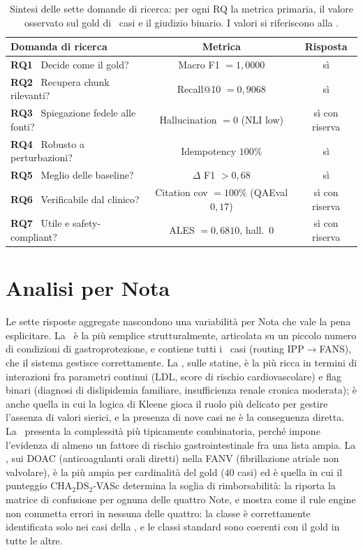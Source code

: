 \begin{table}[t]
  \centering
  \caption{Sintesi delle sette domande di ricerca: per ogni RQ la metrica primaria, il valore osservato sul gold di \goldn\ casi e il giudizio binario. I valori si riferiscono alla \cleanroomrun.}
  \label{tab:rq-summary}
  \small
  \begin{tabular}{p{}cc}
    \toprule
    Domanda di ricerca & Metrica & Risposta \\
    \midrule
    \textbf{RQ1}~ Decide come il gold? & Macro F1 $=1{,}0000$ & sì \\
    \textbf{RQ2}~ Recupera chunk rilevanti? & Recall@10 $=0{,}9068$ & sì \\
    \textbf{RQ3}~ Spiegazione fedele alle fonti? & Hallucination $=0$ (NLI low) & sì con riserva \\
    \textbf{RQ4}~ Robusto a perturbazioni? & Idempotency $100\%$ & sì \\
    \textbf{RQ5}~ Meglio delle baseline? & $\Delta$ F1 $> 0{,}68$ & sì \\
    \textbf{RQ6}~ Verificabile dal clinico? & Citation cov $=100\%$ (QAEval $0{,}17$) & sì con riserva \\
    \textbf{RQ7}~ Utile e safety-compliant? & ALES $=0{,}6810$, hall.~$0$ & sì con riserva \\
    \bottomrule
  \end{tabular}
\end{table}

\section{Analisi per Nota}
\label{sec:per-nota}

Le sette risposte aggregate nascondono una variabilità per Nota che vale la pena esplicitare. La \notezero\ è la più semplice strutturalmente, articolata su un piccolo numero di condizioni di gastroprotezione, e contiene tutti i \goldRouted\ casi  (routing IPP$\to$FANS), che il sistema gestisce correttamente. La \notetredici, sulle statine, è la più ricca in termini di interazioni fra parametri continui (LDL, score di rischio cardiovascolare) e flag binari (diagnosi di dislipidemia familiare, insufficienza renale cronica moderata); è anche quella in cui la logica di Kleene gioca il ruolo più delicato per gestire l'assenza di valori sierici, e la presenza di nove casi  ne è la conseguenza diretta. La \notesessanta\ presenta la complessità più tipicamente combinatoria, perché impone l'evidenza di almeno un fattore di rischio gastrointestinale fra una lista ampia. La \notenova, sui DOAC (anticoagulanti orali diretti) nella FANV (fibrillazione atriale non valvolare), è la più ampia per cardinalità del gold ($40$ casi) ed è quella in cui il punteggio CHA$_2$DS$_2$-VASc determina la soglia di rimborsabilità: la  riporta la matrice di confusione per ognuna delle quattro Note, e mostra come il rule engine non commetta errori in nessuna delle quattro: la classe  è correttamente identificata solo nei casi della \notezero, e le classi standard sono coerenti con il gold in tutte le altre.

